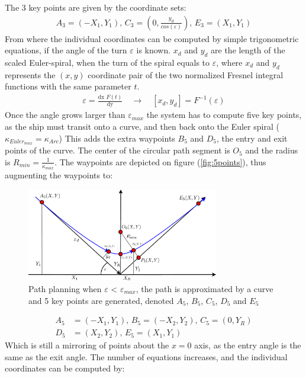 \documentclass{ifacconf}
\begin{document}
The 3 key points are given by the coordinate sets:
\begin{align}
A_3 = (-X_1,Y_1),\, C_3 = (0,\frac{y_d}{cos(\varepsilon)}),\, E_3 = (X_1,Y_1)
\end{align}
From where the individual coordinates can be computed by simple trigonometric equations, if the angle of the turn $\varepsilon$ is known. $x_d$ and $y_d$ are the length of the scaled Euler-spiral, when the turn of the spiral equals to $\varepsilon$, where $x_d$ and $y_d$ represents the $(x,y)$ coordinate pair of the two normalized Fresnel integral functions with the same parameter $t$. 
\begin{align}
\varepsilon = \frac{\textrm{dx }F(t)}{\textrm{dy}} \quad \to \quad [x_d,y_d] = F^{-1}(\varepsilon)
\end{align}
Once the angle grows larger than $\varepsilon_{max}$ the system has to compute five key points, as the ship must transit onto a curve, and then back onto the Euler spiral ($\kappa_{Euler_{max}} = \kappa_{Arc}$) This adds the extra waypoints $B_5$ and $D_5$, the entry and exit points of the curve. The center of the circular path segment is $O_5$ and the radius is $R_{min} = \frac{1}{\kappa_{max}}$. The waypoints are depicted on figure (\ref{fig:5points}), thus augmenting the waypoints to:
\begin{figure}
	\begin{center}
		\includegraphics[width=8.4cm]{img/5Points}    %
		\caption{Path planning when $\varepsilon$ < $\varepsilon_{max}$, the path is approximated by a curve and 5 key points are generated, denoted $A_5$, $B_5$, $C_5$, $D_5$ and $E_5$}  %
		\label{fig:3points}               
	\end{center}                                 %
\end{figure}
\begin{align}
A_5 &= (-X_1,Y_1),\, B_5 = (-X_2,Y_2),\, C_5 = (0,Y_R)\\
D_5 &= (X_2,Y_2),\, E_5 = (X_1,Y_1)
\end{align}
Which is still a mirroring of points about the $x=0$ axis, as the entry angle is the same as the exit angle. The number of equations increases, and the individual coordinates can be computed by:
\end{document}
